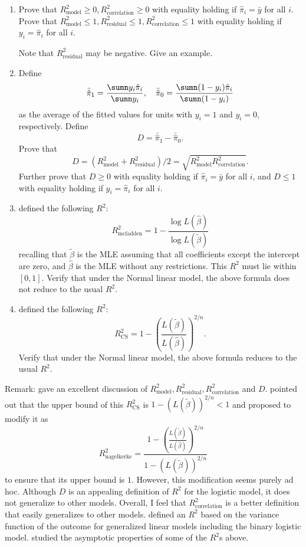 \begin{enumerate}
\item
Prove that $R^2_{\text{model}} \geq 0, R^2_{\text{correlation}}  \geq 0$ with equality holding if  $\hat{\pi}_i = \bar{y}$ for all $i$. Prove that $R^2_{\text{model}}  \leq 1, R^2_{\text{residual}}  \leq 1, R^2_{\text{correlation}}  \leq 1$ with equality holding if  $y_i =\hat{\pi}_i$ for all $i$. 

Note that $R^2_{\text{residual}}$ may be negative. Give an example. 

\item
Define 
$$
\bar{ \hat{\pi} }_1 = \frac{ \sumn y_i  \hat{\pi}_i  }{ \sumn y_i},\quad
\bar{ \hat{\pi} }_0 = \frac{ \sumn (1-y_i)  \hat{\pi}_i  }{ \sumn (1-y_i)}
$$
as the average of the fitted values for units with $y_i=1$ and $y_i=0$, respectively. Define
$$
D = \bar{ \hat{\pi} }_1  - \bar{ \hat{\pi} }_0.
$$
Prove that 
$$
D = (R^2_{\text{model}} +R^2_{\text{residual}}  )/2 = \sqrt{  R^2_{\text{model}}  R^2_{\text{correlation}}  }.
$$
Further prove that $D\geq 0$ with equality holding if   $\hat{\pi}_i = \bar{y}$ for all $i$, and $D\leq 1$ with equality holding if   $y_i =\hat{\pi}_i$ for all $i$. 

\item
\citet{mcfadden1974conditional} defined the following $R^2$:
$$
R^2_{\text{mcfadden}} = 1 - \frac{ \log L(\hat{\beta})  }{  \log L(\tilde{\beta}) }
$$
recalling that
$\tilde{\beta}$ is the MLE assuming that all coefficients except the intercept are zero, and $\hat{\beta}$ is the MLE without any restrictions.
This $R^2$ must lie within $[0,1]$. Verify that under the Normal linear model, the above formula does not reduce to the usual $R^2$. 


\item
\citet{cox1989analysis} defined the following $R^2$:
$$
R^2_{\text{CS}} = 1 - \left(  \frac{  L(\tilde{\beta}) }{  L(\hat{\beta}) }\right)^{2/n}.
$$
Verify that under the Normal linear model, the above formula reduces to the usual $R^2$. 
\end{enumerate}


Remark: \citet{tjur2009coefficients} gave an excellent discussion of $R^2_{\text{model}}   , R^2_{\text{residual}}   , R^2_{\text{correlation}} $ and $D$. \citet{nagelkerke1991note} pointed out that the upper bound of this $R^2_{\text{CS}}$ is $1 - (L(\tilde{\beta}))^{2/n} < 1$ and proposed to modify it as 
$$
R^2_{\text{nagelkerke}} = \frac{ 1 - \left(  \frac{  L(\tilde{\beta}) }{  L(\hat{\beta}) }\right)^{2/n}  }{   1 - \left(    L(\tilde{\beta}) \right)^{2/n}  }
$$
to ensure that its upper bound is $1$. 
However, this modification seems purely ad hoc.
Although $D$ is an appealing definition of $R^2$ for the logistic model, it does not generalize to other models. 
Overall, I feel that $R^2_{\text{correlation}} $ is a better definition that easily generalizes to other models. 
\citet{zhang2017coefficient} defined an $R^2$ based on the variance function of the outcome for generalized linear models including the binary logistic model.  
\citet{hu2006pseudo} studied the asymptotic properties of some of the $R^2$s above. 
 

